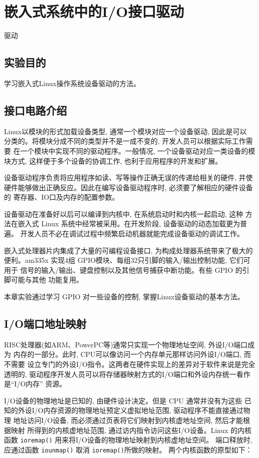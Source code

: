 \chapter{嵌入式系统中的I/O接口驱动}{驱动}

\section{实验目的}
学习嵌入式Linux操作系统设备驱动的方法。

\section{接口电路介绍}
Linux以模块的形式加载设备类型, 通常一个模块对应一个设备驱动, 因此是可以
分类的。将模块分成不同的类型并不是一成不变的, 开发人员可以根据实际工作需要
在一个模块中实现不同的驱动程序。一般情况, 一个设备驱动对应一类设备的模块方式,
这样便于多个设备的协调工作, 也利于应用程序的开发和扩展。

设备驱动程序负责将应用程序如读、写等操作正确无误的传递给相关的硬件, 并使
硬件能够做出正确反应。因此在编写设备驱动程序时, 必须要了解相应的硬件设备的
寄存器、IO口及内存的配置参数。

设备驱动在准备好以后可以编译到内核中, 在系统启动时和内核一起启动, 这种
方法在嵌入式 Linux 系统中经常被采用。在开发阶段, 设备驱动的动态加载更为普遍。
开发人员不必在调试过程中频繁启动机器就能完成设备驱动的调试工作。

嵌入式处理器片内集成了大量的可编程设备接口, 为构成处理器系统带来了极大的
便利。am335x 实现4组 GPIO模块、每组32只引脚的输入/输出控制功能, 它们可用于
信号的输入/输出、键盘控制以及其他信号捕获中断功能。有些 GPIO 的引脚可能与其他
功能复用。

本章实验通过学习 GPIO 对一些设备的控制, 掌握Linux设备驱动的基本方法。

\section{I/O端口地址映射}
RISC处理器(如ARM、PowerPC等)通常只实现一个物理地址空间, 外设I/O端口成为
内存的一部分。此时, CPU可以像访问一个内存单元那样访问外设I/O端口, 而不需要
设立专门的外设I/O指令。这两者在硬件实现上的差异对于软件来说是完全透明的,
驱动程序开发人员可以将存储器映射方式的I/O端口和外设内存统一看作是``I/O内存''
资源。

I/O设备的物理地址是已知的, 由硬件设计决定。但是 CPU 通常并没有为这些
已知的外设I/O内存资源的物理地址预定义虚拟地址范围, 驱动程序不能直接通过物理
地址访问I/O设备, 而必须通过页表将它们映射到内核虚地址空间, 然后才能根据映射
所得到的内核虚地址范围, 通过访内指令访问这些I/O设备。Linux 的内核函数
\verb|ioremap()| 用来将I/O设备的物理地址映射到内核虚地址空间。
端口释放时, 应通过函数 \verb|iounmap()| 取消 \verb|ioremap()|所做的映射。
两个内核函数的原型如下：

